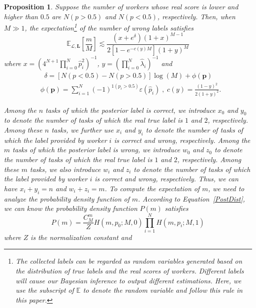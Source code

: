 \documentclass{article}
\makeatletter
\newtheorem{proposition}[theorem]{Proposition}
\renewenvironment{proof}[1][\proofname]{\par
  \vspace{-\topsep}%
  \pushQED{\qed}%
  \normalfont
  \topsep0pt \partopsep0pt %
  \trivlist
  \item[\hskip\labelsep
        \itshape
    #1\@addpunct{.}]\ignorespaces
}{%
  \popQED\endtrivlist\@endpefalse
  \addvspace{0pt plus 0pt} %
}
\makeatother
\begin{document}
\begin{proposition}
\label{ConvBound}
Suppose the number of workers whose real score is lower and higher than $0.5$ are $N(p>0.5)$ and $N(p<0.5)$, respectively.
Then, when $M\gg 1$, the expectation\footnote{The collected labels can be regarded as random variables generated based on the distribution of true labels and the real scores of workers. Different labels will cause our Bayesian inference to output different estimations. Here, we use the subscript of $\mathbb{E}$ to denote the random variable and follow this rule in this paper.} of the number of wrong labels satisfies
\begin{equation*}
\mathbb{E}_{\mathcal{L},\bm{L}}\left[\frac{m}{M}\right]\lesssim \frac{(x+e^{\delta})(1+x)^{M-1}}{2[1-e^{-c(y)M}](1+y)^{M}}
\end{equation*}
where $x=\left(4^{N+1}\prod_{i=0}^{N}\hat{p}^{2}_i\right)^{-1}$, $y=\left(\prod_{i=0}^{N}\hat{\lambda}_{i}\right)^{-1}$ and
\begin{equation*}
\begin{split}
&\;\;\delta = [N(p<0.5)-N(p>0.5)]\log(M)+\phi(\bm{p})\\
&\phi(\bm{p})=\sum_{i=1}^{N}(-1)^{1(p_i>0.5)}\varepsilon(\hat{p}_i)\;,\; c(y)=\frac{(1-y)^2}{2(1+y)^{2}}.
\end{split}
\end{equation*}
\begin{proof}
Among the $n$ tasks of which the posterior label is correct, we introduce $x_0$ and $y_0$ to denote the number of tasks of which the real true label is $1$ and $2$, respectively.
Among these $n$ tasks, we further use $x_i$ and $y_i$ to denote the number of tasks of which the label provided by worker $i$ is correct and wrong, respectively.
Among the $m$ tasks of which the posterior label is wrong, we introduce $w_0$ and $z_0$ to denote the number of tasks of which the real true label is $1$ and $2$, respectively.
Among these $m$ tasks, we also introduce $w_i$ and $z_i$ to denote the number of tasks of which the label provided by worker $i$ is correct and wrong, respectively.
Thus, we can have $x_i+y_i=n$ and $w_i+z_i=m$.
To compute the expectation of $m$, we need to analyze the probability density function of $m$. According to Equation~\ref{PostDist}, we can know the probability density function $P(m)$ satisfies
\begin{equation}
\label{PDist}
P(m) = \frac{C_{M}^{m}}{Z}H(m, p_0; M, 0)\prod_{i=1}^{N}H(m, p_i; M, 1)
\end{equation}
where $Z$ is the normalization constant and

\end{proof}
\end{proposition}
\end{document}
